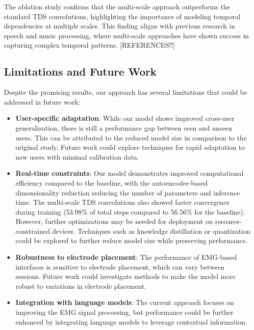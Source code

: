 The ablation study confirms that the multi-scale approach outperforms the standard TDS convolutions, highlighting the importance of modeling temporal dependencies at multiple scales. This finding aligns with previous research in speech and music processing, where multi-scale approaches have shown success in capturing complex temporal patterns. [REFERENCES!!]

\subsection{Limitations and Future Work}

Despite the promising results, our approach has several limitations that could be addressed in future work:

\begin{itemize}
    \item \textbf{User-specific adaptation}: While our model shows improved cross-user generalization, there is still a performance gap between seen and unseen users. This can be attributed to the reduced model size in comparison to the original study. Future work could explore techniques for rapid adaptation to new users with minimal calibration data.

    \item \textbf{Real-time constraints}: Our model demonstrates improved computational efficiency compared to the baseline, with the autoencoder-based dimensionality reduction reducing the number of parameters and inference time. The multi-scale TDS convolutions also showed faster convergence during training (53.98\% of total steps compared to 56.56\% for the baseline). However, further optimizations may be needed for deployment on resource-constrained devices. Techniques such as knowledge distillation or quantization could be explored to further reduce model size while preserving performance.

    \item \textbf{Robustness to electrode placement}: The performance of EMG-based interfaces is sensitive to electrode placement, which can vary between sessions. Future work could investigate methods to make the model more robust to variations in electrode placement.

    \item \textbf{Integration with language models}: The current approach focuses on improving the EMG signal processing, but performance could be further enhanced by integrating language models to leverage contextual information.
\end{itemize}

